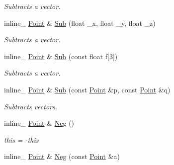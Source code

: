 \begin{DoxyCompactItemize}
\begin{DoxyCompactList}\small\item\em Subtracts a vector. \end{DoxyCompactList}\item 
inline\+\_\+ \hyperlink{classPoint}{Point} \& \hyperlink{classPoint_ad428b3bb1d4867f9e498496801339158}{Sub} (float \+\_\+x, float \+\_\+y, float \+\_\+z)\hypertarget{classPoint_ad428b3bb1d4867f9e498496801339158}{}\label{classPoint_ad428b3bb1d4867f9e498496801339158}

\begin{DoxyCompactList}\small\item\em Subtracts a vector. \end{DoxyCompactList}\item 
inline\+\_\+ \hyperlink{classPoint}{Point} \& \hyperlink{classPoint_ab65b6c36f4f4812ed9acb2ac293b7b77}{Sub} (const float f\mbox{[}3\mbox{]})\hypertarget{classPoint_ab65b6c36f4f4812ed9acb2ac293b7b77}{}\label{classPoint_ab65b6c36f4f4812ed9acb2ac293b7b77}

\begin{DoxyCompactList}\small\item\em Subtracts a vector. \end{DoxyCompactList}\item 
inline\+\_\+ \hyperlink{classPoint}{Point} \& \hyperlink{classPoint_a7a0f4b5feb0f869a73750aba781dc3f6}{Sub} (const \hyperlink{classPoint}{Point} \&p, const \hyperlink{classPoint}{Point} \&q)\hypertarget{classPoint_a7a0f4b5feb0f869a73750aba781dc3f6}{}\label{classPoint_a7a0f4b5feb0f869a73750aba781dc3f6}

\begin{DoxyCompactList}\small\item\em Subtracts vectors. \end{DoxyCompactList}\item 
inline\+\_\+ \hyperlink{classPoint}{Point} \& \hyperlink{classPoint_a50b7f65a161a670c094c014d30615554}{Neg} ()\hypertarget{classPoint_a50b7f65a161a670c094c014d30615554}{}\label{classPoint_a50b7f65a161a670c094c014d30615554}

\begin{DoxyCompactList}\small\item\em this = -\/this \end{DoxyCompactList}\item 
inline\+\_\+ \hyperlink{classPoint}{Point} \& \hyperlink{classPoint_acf9cfb48a2151bf50990a7d47f5035d0}{Neg} (const \hyperlink{classPoint}{Point} \&a)\hypertarget{classPoint_acf9cfb48a2151bf50990a7d47f5035d0}{}\label{classPoint_acf9cfb48a2151bf50990a7d47f5035d0}


\end{DoxyCompactItemize}
